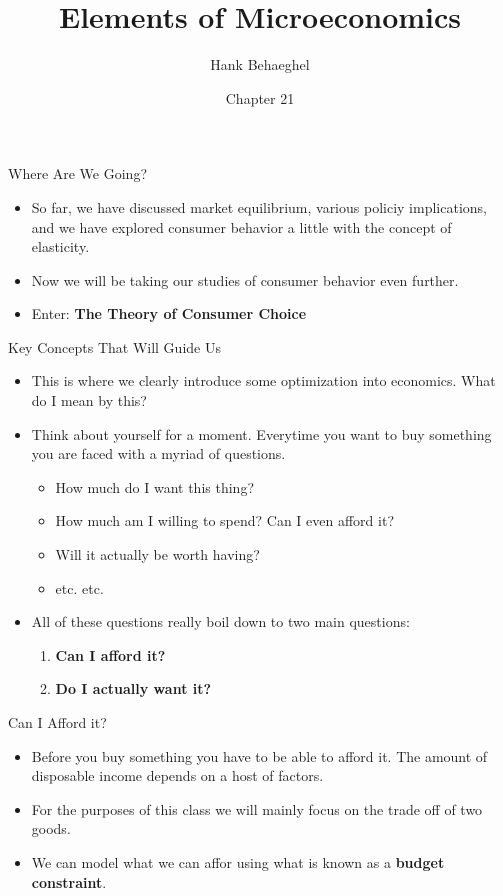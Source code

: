 \documentclass[aspectratio=169]{beamer}
\title{Elements of Microeconomics}
\author{Hank Behaeghel}
\institute{Johns Hopkins University}
\date{Chapter 21}
\begin{document}
\maketitle

\begin{frame}{Where Are We Going?}
    \begin{itemize}
        \item So far, we have discussed market equilibrium, various policiy implications, and we have explored consumer behavior
        a little with the concept of elasticity.
        \item Now we will be taking our studies of consumer behavior even further.
        \item Enter: \textbf{The Theory of Consumer Choice}
    \end{itemize}
\end{frame}

\begin{frame}{Key Concepts That Will Guide Us}
    \begin{itemize}
        \item This is where we clearly introduce some optimization into economics. What do I mean by this?
        \item Think about yourself for a moment. Everytime you want to buy something you are faced with a myriad of questions.
        \begin{itemize}
            \item <2->How much do I want this thing?
            \item <3->How much am I willing to spend? Can I even afford it?
            \item <4->Will it actually be worth having?
            \item <4->etc. etc.
        \end{itemize}
       \item  <5-> All of these questions really boil down to two main questions:
        \begin{enumerate}
            \item <6-> \textbf{Can I afford it?}
            \item<7-> \textbf{Do I actually want it?}
        \end{enumerate}
    \end{itemize}
\end{frame}

\begin{frame}{Can I Afford it?}   
\begin{itemize}
    \item Before you buy something you have to be able to afford it. The amount of disposable income depends on a host of factors.
    \item For the purposes of this class we will mainly focus on the trade off of two goods.
    \item We can model what we can affor using what is known as a \textbf{budget constraint}.
\end{itemize}
\end{frame}
\end{document}
